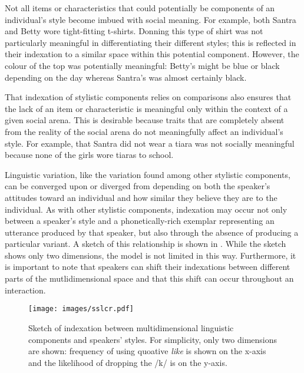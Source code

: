 Not all items or characteristics that could potentially be components of an individual's style become imbued with social meaning.  For example, both Santra and Betty wore tight-fitting t-shirts.  Donning this type of shirt was not particularly meaningful in differentiating their different styles; this is reflected in their inde\-xation to a similar space within this potential component.  However, the colour of the top was potentially meaningful: Betty's might be blue or black depending on the day whereas Santra's was almost certainly black.  

That indexation of stylistic components relies on comparisons also ensures that the lack of an item or characteristic is meaningful only within the context of a given social arena.  This is desirable because traits that are completely absent from the reality of the social arena do not meaningfully affect an individual's style.  For example, that Santra did not wear a tiara was not socially meaningful because none of the girls wore tiaras to school.  

Linguistic variation, like the variation found among other stylistic components, can be converged upon or diverged from depending on both the speaker's attitudes toward an individual and how similar they believe they are to the indivi\-dual.  As with other stylistic components, indexation may occur not only between a speaker's style and a phonetically-rich exemplar representing an utterance produced by that speaker, but also through the absence of producing a particular variant.  A sketch of this relationship is shown in . While the sketch shows only two dimensions, the model is not limited in this way. Furthermore, it is important to note that speakers can shift their indexations between different parts of the mutlidimensional space and that this shift can occur throughout an interaction.

\begin{figure}
	\centering
		\texttt{[image: images/sslcr.pdf]} %
% 	
	\caption{Sketch of indexation between multidimensional linguistic components and speakers' styles. For simplicity, only two dimensions are shown: frequency of using quoative \textit{like} is shown on the x-axis and the likelihood of dropping the /k/ is on the y-axis.}
	\label{fig:SketchStylesLing}
\end{figure}


